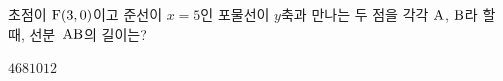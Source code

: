 초점이 $\mathrm{F}(3{,}\mkern3mu\mathopen{}0)$이고 준선이 $x=5$인 포물선이 $y$축과 만나는 두 점을 각각 $\mathrm{A}$, $\mathrm{B}$라 할 때, 선분~$\mathrm{AB}$의 길이는?
\begin{choices32}{$4$}{$6$}{$8$}{$10$}{$12$}\end{choices32}

